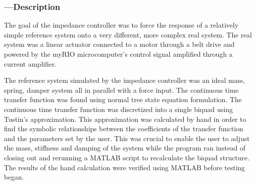 \subsubsection*{ ---Description}
The goal of the impedance controller was to force the response of a relatively simple reference system onto a very different, more complex real system. The real system was a linear actuator connected to a motor through a belt drive and powered by the myRIO microcomputer's control signal amplified through a current amplifier. 

The reference system simulated by the impedance controller was an ideal mass, spring, damper system all in parallel with a force input. The continuous time transfer function was found using normal tree state equation formulation. The continuous time transfer function was discretized into a single biquad using Tustin's approximation. This approximation was calculated by hand in order to find the symbolic relationships between the coefficients of the transfer function and the parameters set by the user. This was crucial to enable the user to adjust the mass, stiffness and damping of the system while the program ran instead of closing out and rerunning a MATLAB script to recalculate the biquad structure. The results of the hand calculation were verified using MATLAB before testing began. 